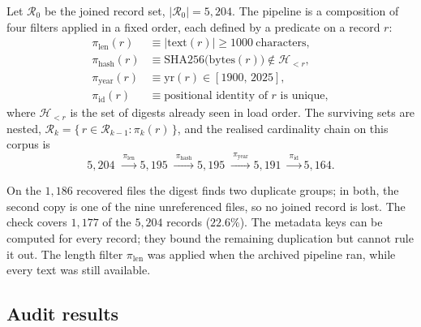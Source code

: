 \documentclass[conference,a4paper]{IEEEtran}
\begin{document}
Let $\mathcal{R}_0$ be the joined record set, $|\mathcal{R}_0| = 5{,}204$.
The pipeline is a composition of four filters applied in a fixed order,
each defined by a predicate on a record $r$:
\begin{align}
\pi_{\text{len}}(r)  &\equiv |\mathrm{text}(r)| \ge 1000 \ \text{characters},\\
\pi_{\text{hash}}(r) &\equiv \mathrm{SHA256}\bigl(\mathrm{bytes}(r)\bigr)
   \notin \mathcal{H}_{<r},\\
\pi_{\text{year}}(r) &\equiv \mathrm{yr}(r) \in [1900,\, 2025],\\
\pi_{\text{id}}(r)   &\equiv \text{positional identity of } r
   \text{ is unique},
\end{align}
where $\mathcal{H}_{<r}$ is the set of digests already seen in load order.
The surviving sets are nested,
$\mathcal{R}_{k} = \{\, r \in \mathcal{R}_{k-1} : \pi_k(r) \,\}$, and the
realised cardinality chain on this corpus is
\begin{equation}
\label{eq:chain}
5{,}204
\;\xrightarrow{\ \pi_{\text{len}}\ } 5{,}195
\;\xrightarrow{\ \pi_{\text{hash}}\ } 5{,}195
\;\xrightarrow{\ \pi_{\text{year}}\ } 5{,}191
\;\xrightarrow{\ \pi_{\text{id}}\ } 5{,}164 .
\end{equation}

On the $1{,}186$ recovered files the digest finds two duplicate groups;
in both, the second copy is one of the nine unreferenced files, so no
joined record is lost. The check covers $1{,}177$ of the $5{,}204$
records ($22.6\%$). The metadata keys can be computed for every
record; they bound the remaining duplication but cannot rule it out. The
length filter $\pi_{\text{len}}$ was applied when the archived pipeline
ran, while every text was still available.

\subsection{Audit results}
\end{document}

